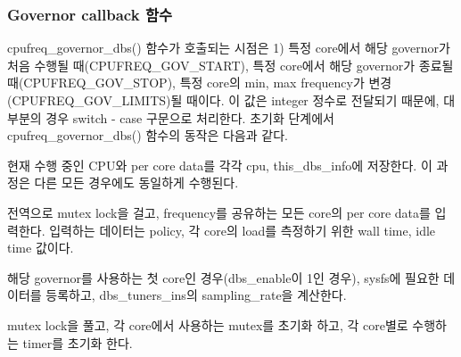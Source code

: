 \subsubsection{Governor callback 함수}

cpufreq\_governor\_dbs() 함수가 호출되는 시점은 1) 특정 core에서 해당 governor가 처음 수행될 때(CPUFREQ\_GOV\_START), 특정 core에서 해당 governor가 종료될 때(CPUFREQ\_GOV\_STOP), 특정 core의 min, max frequency가 변경(CPUFREQ\_GOV\_LIMITS)될 때이다. 
이 값은 integer 정수로 전달되기 때문에, 대부분의 경우 switch - case 구문으로 처리한다. 
초기화 단계에서 cpufreq\_governor\_dbs() 함수의 동작은 다음과 같다. 
\vspace{\baselineskip}  %
\begin{compactenum}
\item 현재 수행 중인 CPU와 per core data를 각각 cpu, this\_dbs\_info에 저장한다. 이 과정은 다른 모든 경우에도 동일하게 수행된다.
\item 전역으로 mutex lock을 걸고, frequency를 공유하는 모든 core의 per core data를 입력한다. 
입력하는 데이터는 policy, 각 core의 load를 측정하기 위한 wall time, idle time 값이다. 
\item 해당 governor를 사용하는 첫 core인 경우(dbs\_enable이 1인 경우), sysfs에 필요한 데이터를 등록하고, 
dbs\_tuners\_ins의 sampling\_rate을 계산한다. 
\item mutex lock을 풀고, 각 core에서 사용하는 mutex를 초기화 하고, 각 core별로 수행하는 timer를 초기화 한다.
\end{compactenum}

